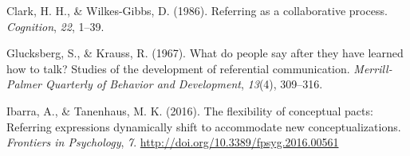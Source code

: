 \documentclass[10pt, letterpaper]{article}
\begin{document}
\leavevmode\hypertarget{ref-Clark1986Referring}{}%
Clark, H. H., \& Wilkes-Gibbs, D. (1986). Referring as a collaborative
process. \emph{Cognition}, \emph{22}, 1--39.

\leavevmode\hypertarget{ref-Glucksberg1967What}{}%
Glucksberg, S., \& Krauss, R. (1967). What do people say after they have
learned how to talk? Studies of the development of referential
communication. \emph{Merrill-Palmer Quarterly of Behavior and
Development}, \emph{13}(4), 309--316.

\leavevmode\hypertarget{ref-Ibarra2016flexibility}{}%
Ibarra, A., \& Tanenhaus, M. K. (2016). The flexibility of conceptual
pacts: Referring expressions dynamically shift to accommodate new
conceptualizations. \emph{Frontiers in Psychology}, \emph{7}.
\url{http://doi.org/10.3389/fpsyg.2016.00561}


\end{document}
